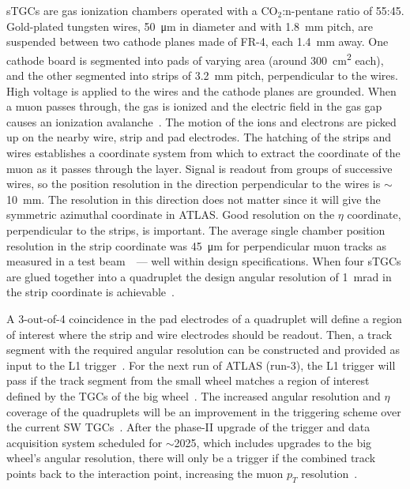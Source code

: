 sTGCs are gas ionization chambers operated with a CO$_2$:n-pentane ratio of 55:45. Gold-plated tungsten wires, \SI{50}{\micro\meter} in diameter and with \SI{1.8}{mm} pitch, are suspended between two cathode planes made of FR-4, each \SI{1.4}{mm} away. One cathode board is segmented into pads of varying area (around \SI{300}{cm^2} each), and the other segmented into strips of \SI{3.2}{mm} pitch, perpendicular to the wires. High voltage is applied to the wires and the cathode planes are grounded. When a muon passes through, the gas is ionized and the electric field in the gas gap causes an ionization avalanche~\cite{townsend_electricity_1915}. The motion of the ions and electrons are picked up on the nearby wire, strip and pad electrodes. The hatching of the strips and wires establishes a coordinate system from which to extract the coordinate of the muon as it passes through the layer. Signal is readout from groups of successive wires, so the position resolution in the direction perpendicular to the wires is $\sim$\SI{10}{mm}. The resolution in this direction does not matter since it will give the symmetric azimuthal coordinate in ATLAS. Good resolution on the $\eta$ coordinate, perpendicular to the strips, is important. The average single chamber position resolution in the strip coordinate was \SI{45}{\micro\meter} for perpendicular muon tracks as measured in a test beam~\cite{abusleme_performance_2016}~--- well within design specifications. When four sTGCs are glued together into a quadruplet the design angular resolution of \SI{1}{mrad} in the strip coordinate is achievable~\cite{nsw_tdr, perez-codina_small-strip_2016}.

A 3-out-of-4 coincidence in the pad electrodes of a quadruplet will define a region of interest where the strip and wire electrodes should be readout. Then, a track segment with the required angular resolution can be constructed and provided as input to the L1 trigger~\cite{nsw_tdr}. For the next run of ATLAS (run-3), the L1 trigger will pass if the track segment from the small wheel matches a region of interest defined by the TGCs of the big wheel~\cite{tdaq_phase1_tdr}. The increased angular resolution and $\eta$ coverage of the quadruplets will be an improvement in the triggering scheme over the current SW TGCs~\cite{nsw_tdr}. After the phase-II upgrade of the trigger and data acquisition system scheduled for $\sim$2025, which includes upgrades to the big wheel's angular resolution, there will only be a trigger if the combined track points back to the interaction point, increasing the muon $p_T$ resolution~\cite{tdaq_phase2_tdr}.

